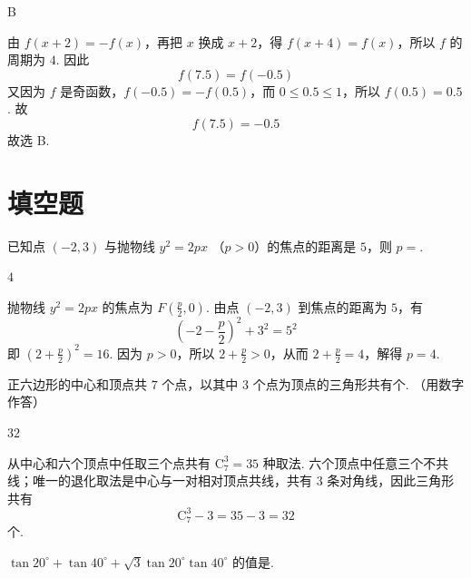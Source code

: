 \documentclass[UTF8,a4paper,oneside,11pt]{ctexbook}
\begin{document}
\begin{answer}
B
\end{answer}

\begin{solution}
由 \(f(x+2)=-f(x)\)，再把 \(x\) 换成 \(x+2\)，得 \(f(x+4)=f(x)\)，所以 \(f\) 的周期为 \(4\). 因此
\[
f(7.5)=f(-0.5)
\]
又因为 \(f\) 是奇函数，\(f(-0.5)=-f(0.5)\)，而 \(0\leqslant0.5\leqslant1\)，所以 \(f(0.5)=0.5\). 故
\[
f(7.5)=-0.5
\]
故选 B.
\end{solution}

\section{填空题}

\begin{problem}
已知点 \((-2,3)\) 与抛物线 \(y^{2} = 2px\) （\(p > 0\)）的焦点的距离是 \(5\)，则 \(p =\)\fillinblank{}.
\end{problem}

\begin{answer}
\(4\)
\end{answer}

\begin{solution}
抛物线 \(y^2=2px\) 的焦点为 \(F\left(\frac{p}{2},0\right)\). 由点 \((-2,3)\) 到焦点的距离为 \(5\)，有
\[
\left(-2-\frac{p}{2}\right)^2+3^2=5^2
\]
即 \(\left(2+\frac{p}{2}\right)^2=16\). 因为 \(p>0\)，所以 \(2+\frac{p}{2}>0\)，从而 \(2+\frac{p}{2}=4\)，解得 \(p=4\).
\end{solution}

\begin{problem}
正六边形的中心和顶点共 \(7\text{ 个}\)点，以其中 \(3\text{ 个}\)点为顶点的三角形共有\fillinblank{}个. （用数字作答）
\end{problem}

\begin{answer}
\(32\)
\end{answer}

\begin{solution}
从中心和六个顶点中任取三个点共有 \(\mathrm C_7^3=35\) 种取法. 六个顶点中任意三个不共线；唯一的退化取法是中心与一对相对顶点共线，共有 \(3\) 条对角线，因此三角形共有
\[
\mathrm C_7^3-3=35-3=32
\]
个.
\end{solution}

\begin{problem}
\(\tan 20^{\circ} + \tan 40^{\circ} + \sqrt{3}\tan 20^{\circ}\tan 40^{\circ}\) 的值是\fillinblank{}.
\end{problem}
\end{document}

